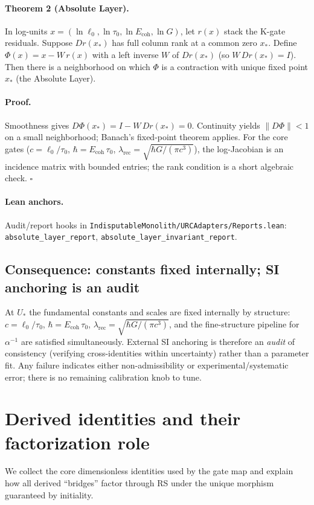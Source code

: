 \documentclass[11pt]{article}
\begin{document}
\paragraph{Theorem 2 (Absolute Layer).} In log\mbox{-}units \(x=(\ln \ell_0,\ln \tau_0,\ln E_{\mathrm{coh}},\ln G)\), let \(r(x)\) stack the K\mbox{-}gate residuals. Suppose \(D r(x_*)\) has full column rank at a common zero \(x_*\). Define \(\Phi(x)=x-W\,r(x)\) with a left inverse \(W\) of \(D r(x_*)\) (so \(W\,D r(x_*)=I\)). Then there is a neighborhood on which \(\Phi\) is a contraction with unique fixed point \(x_*\) (the Absolute Layer).

\paragraph{Proof.} Smoothness gives \(D\Phi(x_*)=I-W\,D r(x_*)=0\). Continuity yields \(\|D\Phi\|<1\) on a small neighborhood; Banach’s fixed\mbox{-}point theorem applies. For the core gates (\(c=\ell_0/\tau_0\), \(\hbar=E_{\mathrm{coh}}\,\tau_0\), \(\lambda_{\mathrm{rec}}=\sqrt{\hbar G/(\pi c^3)}\)), the log\mbox{-}Jacobian is an incidence matrix with bounded entries; the rank condition is a short algebraic check. \hfill$\square$

\paragraph{Lean anchors.} Audit/report hooks in \texttt{IndisputableMonolith/URCAdapters/Reports.lean}: \texttt{absolute\_layer\_report}, \texttt{absolute\_layer\_invariant\_report}.

\subsection{Consequence: constants fixed internally; SI anchoring is an audit}
At \(U_*\) the fundamental constants and scales are fixed internally by structure: \(c=\ell_0/\tau_0\), \(\hbar=E_{\mathrm{coh}}\,\tau_0\), \(\lambda_{\mathrm{rec}}=\sqrt{\hbar G/(\pi c^3)}\), and the fine\mbox{-}structure pipeline for \(\alpha^{-1}\) are satisfied simultaneously. External SI anchoring is therefore an \emph{audit} of consistency (verifying cross\mbox{-}identities within uncertainty) rather than a parameter fit. Any failure indicates either non\mbox{-}admissibility or experimental/systematic error; there is no remaining calibration knob to tune.

\section{Derived identities and their factorization role}
We collect the core dimensionless identities used by the gate map and explain how all derived ``bridges'' factor through RS under the unique morphism guaranteed by initiality.
\end{document}
